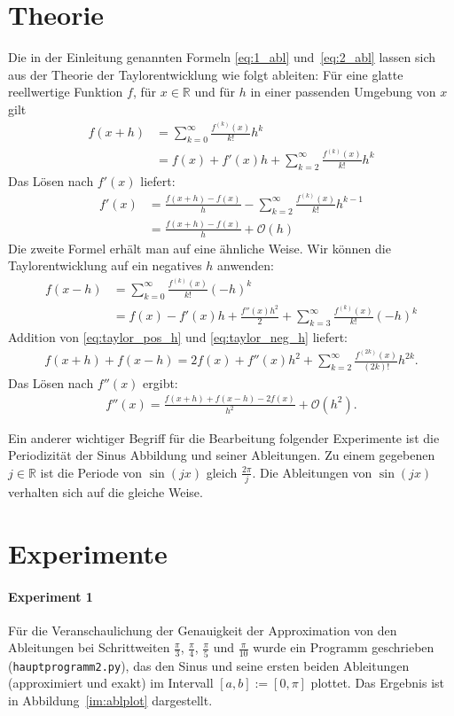 \documentclass[smallheadings]{scrartcl}
\begin{document}
\section{Theorie}
Die in der Einleitung genannten Formeln  \eqref{eq:1_abl} und~\eqref{eq:2_abl}  lassen sich aus der Theorie der Taylorentwicklung wie folgt ableiten:
Für eine glatte reellwertige Funktion $f$, für $x\in\mathbb{R}$ und für $h$ in einer passenden Umgebung von $x$ gilt
\begin{align}
f(x+h)&=\sum_{k=0}^{\infty}\frac{f^{(k)}(x)}{k!}h^k\\
&=f(x)+f'(x)h+\sum_{k=2}^{\infty}\frac{f^{(k)}(x)}{k!}h^k
\label{eq:taylor_neg_h}
\end{align}
Das Lösen nach $f'(x)$ liefert:
\begin{align}
f'(x)&=\frac{f(x+h)-f(x)}{h}-\sum_{k=2}^{\infty}\frac{f^{(k)}(x)}{k!}h^{k-1}\\
&=\frac{f(x+h)-f(x)}{h}+\mathcal{O}(h)
\end{align}
Die zweite Formel erhält man auf eine ähnliche Weise. Wir können die Taylorentwicklung auf ein negatives $h$ anwenden:
\begin{align}
f(x-h)&=\sum_{k=0}^{\infty}\frac{f^{(k)}(x)}{k!}(-h)^k\\
&=f(x)-f'(x)h+\frac{f''(x)h^2}{2} +\sum_{k=3}^{\infty}\frac{f^{(k)}(x)}{k!}(-h)^k
\label{eq:taylor_pos_h}
\end{align}
Addition von \eqref{eq:taylor_pos_h} und \eqref{eq:taylor_neg_h} liefert:
\begin{align}
f(x+h)+f(x-h)=2f(x)+f''(x)h^2+\sum_{k=2}^{\infty}\frac{f^{(2k)}(x)}{(2k)!}h^{2k}.
\end{align}
Das Lösen nach $f''(x)$ ergibt:
\begin{align}
f''(x)=\frac{f(x+h)+f(x-h)-2f(x)}{h^2}+\mathcal{O}(h^2).
\end{align}


Ein anderer wichtiger Begriff für die Bearbeitung folgender Experimente ist die Periodizität der Sinus Abbildung und seiner Ableitungen. Zu einem gegebenen $j\in\mathbb{R}$ ist die Periode von $\sin(jx)$ gleich $\frac{2\pi}{j}$. Die Ableitungen von $\sin(jx)$ verhalten sich auf die gleiche Weise.

\section{Experimente}

\paragraph{Experiment 1}
Für die Veranschaulichung der Genauigkeit der Approximation von den Ableitungen bei Schrittweiten $\frac{\pi}{3}$, $\frac{\pi}{4}$, $\frac{\pi}{5}$ und $\frac{\pi}{10}$ wurde ein Programm geschrieben (\texttt{hauptprogramm2.py}), das den Sinus und seine ersten beiden Ableitungen (approximiert und exakt) im Intervall $\left[a,b\right]:=\left[0,\pi\right]$ plottet. Das Ergebnis ist in Abbildung~\ref{im:ablplot} dargestellt.
\end{document}
